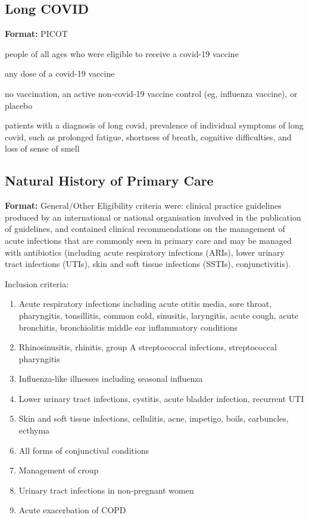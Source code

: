 \documentclass[11pt,a4paper]{article}
\begin{document}
\subsection{Long COVID}
\textbf{Format:} PICOT
\begin{description}[style=nextline]
    \item[Population:] people of all ages who were eligible to receive a covid-19 vaccine
    \item[Intervention:] any dose of a covid-19 vaccine
    \item[Comparator:] no vaccination, an active non-covid-19 vaccine control (eg, influenza vaccine), or placebo
    \item[Outcome:] patients with a diagnosis of long covid, prevalence of individual symptoms of long covid, such as prolonged fatigue, shortness of breath, cognitive difficulties, and loss of sense of smell
\end{description}

\subsection{Natural History of Primary Care}
\textbf{Format:} General/Other
\newline
Eligibility criteria were: clinical practice guidelines produced by an international or national organisation involved in the publication of guidelines, and contained clinical recommendations on the management of acute infections that are commonly seen in primary care and may be managed with antibiotics (including acute respiratory infections (ARIs), lower urinary tract infections (UTIs), skin and soft tissue infections (SSTIs), conjunctivitis).

Inclusion criteria:
\begin{enumerate}[noitemsep]
    \item Acute respiratory infections including acute otitis media, sore throat, pharyngitis, tonsillitis, common cold, sinusitis, laryngitis, acute cough, acute bronchitis, bronchiolitis middle ear inflammatory conditions
    \item Rhinosinusitis, rhinitis, group A streptococcal infections, streptococcal pharyngitis
    \item Influenza-like illnesses including seasonal influenza
    \item Lower urinary tract infections, cystitis, acute bladder infection, recurrent UTI
    \item Skin and soft tissue infections, cellulitis, acne, impetigo, boils, carbuncles, ecthyma
    \item All forms of conjunctival conditions
    \item Management of croup
    \item Urinary tract infections in non-pregnant women
    \item Acute exacerbation of COPD
\end{enumerate}
\end{document}
